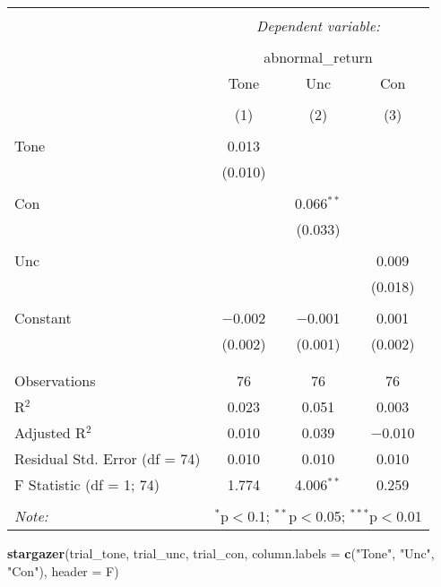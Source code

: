\documentclass[
]{article}
\newenvironment{Shaded}{\begin{snugshade}}{\end{snugshade}}
\newcommand{\AttributeTok}[1]{\textcolor[rgb]{0.13,0.29,0.53}{#1}}
\newcommand{\FunctionTok}[1]{\textcolor[rgb]{0.13,0.29,0.53}{\textbf{#1}}}
\newcommand{\NormalTok}[1]{#1}
\newcommand{\StringTok}[1]{\textcolor[rgb]{0.31,0.60,0.02}{#1}}
\begin{document}
\begin{table}[!htbp] \centering 
  \caption{} 
  \label{} 
\begin{tabular}{@{\extracolsep{5pt}}lccc} 
\\[-1.8ex]\hline 
\hline \\[-1.8ex] 
 & \multicolumn{3}{c}{\textit{Dependent variable:}} \\ 
\cline{2-4} 
\\[-1.8ex] & \multicolumn{3}{c}{abnormal\_return} \\ 
 & Tone & Unc & Con \\ 
\\[-1.8ex] & (1) & (2) & (3)\\ 
\hline \\[-1.8ex] 
 Tone & 0.013 &  &  \\ 
  & (0.010) &  &  \\ 
  & & & \\ 
 Con &  & 0.066$^{**}$ &  \\ 
  &  & (0.033) &  \\ 
  & & & \\ 
 Unc &  &  & 0.009 \\ 
  &  &  & (0.018) \\ 
  & & & \\ 
 Constant & $-$0.002 & $-$0.001 & 0.001 \\ 
  & (0.002) & (0.001) & (0.002) \\ 
  & & & \\ 
\hline \\[-1.8ex] 
Observations & 76 & 76 & 76 \\ 
R$^{2}$ & 0.023 & 0.051 & 0.003 \\ 
Adjusted R$^{2}$ & 0.010 & 0.039 & $-$0.010 \\ 
Residual Std. Error (df = 74) & 0.010 & 0.010 & 0.010 \\ 
F Statistic (df = 1; 74) & 1.774 & 4.006$^{**}$ & 0.259 \\ 
\hline 
\hline \\[-1.8ex] 
\textit{Note:}  & \multicolumn{3}{r}{$^{*}$p$<$0.1; $^{**}$p$<$0.05; $^{***}$p$<$0.01} \\ 
\end{tabular} 
\end{table}

\begin{Shaded}
\begin{Highlighting}[]
\FunctionTok{stargazer}\NormalTok{(trial\_tone, trial\_unc, trial\_con,}
          \AttributeTok{column.labels =} \FunctionTok{c}\NormalTok{(}\StringTok{"Tone"}\NormalTok{, }\StringTok{"Unc"}\NormalTok{, }\StringTok{"Con"}\NormalTok{), }\AttributeTok{header =}\NormalTok{ F)}
\end{Highlighting}
\end{Shaded}
\end{document}
